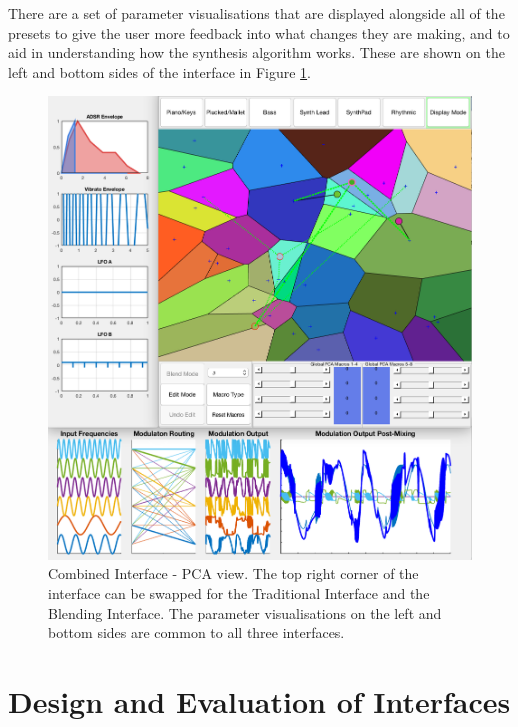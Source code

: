\documentclass[11pt, oneside]{report}   	%
\begin{document}
 There are a set of parameter visualisations that are displayed alongside all of the presets to give the user more feedback into what changes they are making, and to aid in understanding how the synthesis algorithm works. These are shown on the left and bottom sides of the interface in Figure \ref{fig:CombinedInterface}.
\begin{figure}[h] 
	\centering
	\hspace*{-1.5cm}
	\includegraphics[width = 7.5in]{CombinedInterface1.png}
	\caption{Combined Interface - PCA view. The top right corner of the interface can be swapped for the Traditional Interface and the Blending Interface. The parameter visualisations on the left and bottom sides are common to all three interfaces.}
	\label{fig:CombinedInterface}
\end{figure}

\chapter{Design and Evaluation of Interfaces}
\end{document}
